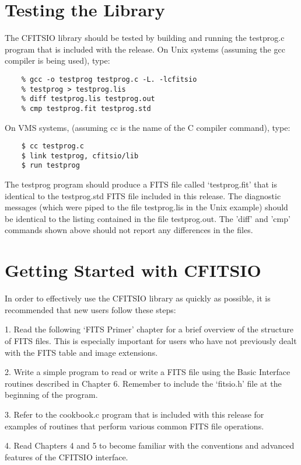 \section{Testing the Library}

The CFITSIO library should be tested by building and running
the testprog.c program that is included with the release.
On Unix systems (assuming the gcc compiler is being used), type:

\begin{verbatim}
    % gcc -o testprog testprog.c -L. -lcfitsio
    % testprog > testprog.lis
    % diff testprog.lis testprog.out
    % cmp testprog.fit testprog.std
\end{verbatim}
 On VMS systems,
(assuming cc is the name of the C compiler command), type:

\begin{verbatim}
    $ cc testprog.c
    $ link testprog, cfitsio/lib
    $ run testprog
\end{verbatim}
The testprog program should produce a FITS file called `testprog.fit'
that is identical to the testprog.std FITS file included in this
release.  The diagnostic messages (which were piped to the file
testprog.lis in the Unix example) should be identical to the listing
contained in the file testprog.out.  The 'diff' and 'cmp' commands
shown above should not report any differences in the files.


\section{Getting Started with CFITSIO}

In order to effectively use the CFITSIO library as quickly as possible,
it is recommended that new users follow these steps:

1.  Read the following `FITS Primer' chapter for a brief
overview of the structure of FITS files.  This is especially important
for users who have not previously dealt with the FITS table and image
extensions.

2.  Write a simple program to read or write a FITS file using the Basic
Interface routines described in Chapter 6.  Remember to include the
`fitsio.h' file at the beginning of the program.

3.  Refer to the cookbook.c program that is included with this release
for examples of routines that perform various common FITS file
operations.

4. Read Chapters 4 and 5 to become familiar with the conventions and
advanced features of the CFITSIO interface.

